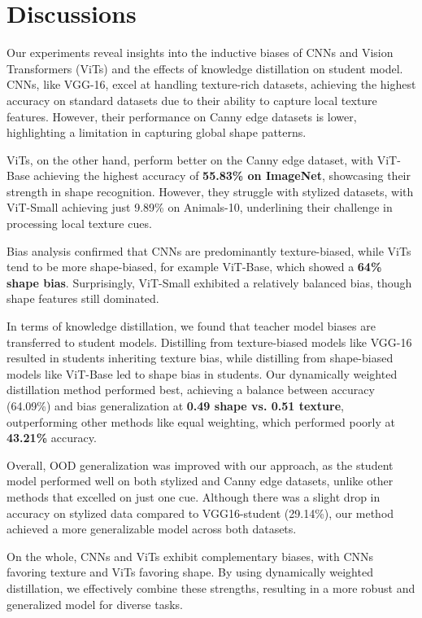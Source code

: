 \documentclass{article}
\begin{document}
\section{Discussions}

Our experiments reveal insights into the inductive biases of CNNs and Vision Transformers (ViTs) and the effects of knowledge distillation on student model. CNNs, like VGG-16, excel at handling texture-rich datasets, achieving the highest accuracy on standard datasets due to their ability to capture local texture features. However, their performance on Canny edge datasets is lower, highlighting a limitation in capturing global shape patterns.

ViTs, on the other hand, perform better on the Canny edge dataset, with ViT-Base achieving the highest accuracy of \textbf{55.83\% on ImageNet}, showcasing their strength in shape recognition. However, they struggle with stylized datasets, with ViT-Small achieving just 9.89\% on Animals-10, underlining their challenge in processing local texture cues.

Bias analysis confirmed that CNNs are predominantly texture-biased, while ViTs tend to be more shape-biased, for example ViT-Base, which showed a \textbf{64\% shape bias}. Surprisingly, ViT-Small exhibited a relatively balanced bias, though shape features still dominated.

In terms of knowledge distillation, we found that teacher model biases are transferred to student models. Distilling from texture-biased models like VGG-16 resulted in students inheriting texture bias, while distilling from shape-biased models like ViT-Base led to shape bias in students. Our dynamically weighted distillation method performed best, achieving a balance between accuracy (64.09\%) and bias generalization at \textbf{0.49 shape vs. 0.51 texture}, outperforming other methods like equal weighting, which performed poorly at \textbf{43.21\%} accuracy.

Overall, OOD generalization was improved with our approach, as the student model performed well on both stylized and Canny edge datasets, unlike other methods that excelled on just one cue. Although there was a slight drop in accuracy on stylized data compared to VGG16-student (29.14\%), our method achieved a more generalizable model across both datasets.

On the whole, CNNs and ViTs exhibit complementary biases, with CNNs favoring texture and ViTs favoring shape. By using dynamically weighted distillation, we effectively combine these strengths, resulting in a more robust and generalized model for diverse tasks.
\end{document}
